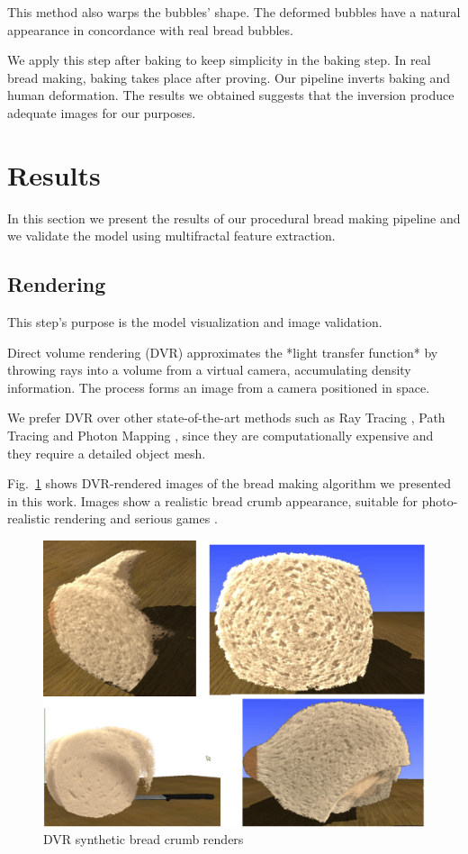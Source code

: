 \documentclass[final,5p,times]{elsarticle}
\begin{document}
This method also warps the bubbles' shape. The deformed bubbles have a natural appearance in concordance with real bread bubbles. 

We apply this step after baking to keep simplicity in the baking step. In real bread making, baking takes place after proving. Our pipeline inverts baking and human deformation. The results we obtained suggests that the inversion produce adequate images for our purposes.

\section{Results}
In this section we present the results of our procedural bread making pipeline and we validate the model using multifractal feature extraction.

\subsection{Rendering}
This step's purpose is the model visualization and image validation.

Direct volume rendering (DVR) \cite{Levoy1988, Max1995,Kruger2003} approximates the *light transfer function* \cite{} by throwing rays into a volume from a virtual camera, accumulating density information. The process forms an image from a camera positioned in space.

We prefer DVR over other state-of-the-art methods such as Ray Tracing \cite{Whitted1980,Singh2010}, Path Tracing \cite{Lafortune1993} and Photon Mapping \cite{Jensen1996}, since they are computationally expensive and they require a detailed object mesh.

Fig.~\ref{FigRenders} shows DVR-rendered images  of the bread making algorithm we presented in this work. Images show a realistic bread crumb appearance, suitable for photo-realistic rendering and serious games \cite{Susi2007}.

\begin{figure}[h!]
\includegraphics[scale=0.15]{render2.png}
\caption{DVR synthetic bread crumb renders}
\label{FigRenders}
\end{figure}
\end{document}
